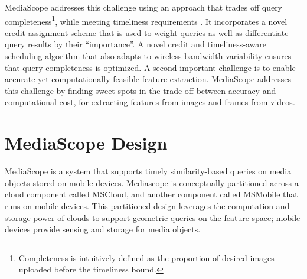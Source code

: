 \documentclass{sig-alt-release2}
\newcommand{\mscope}{MediaScope\xspace}
\begin{document}

\mscope addresses this challenge using an approach that trades off
query completeness\footnote{Completeness is intuitively defined as the proportion of desired images uploaded before the timeliness bound.}, while meeting
timeliness requirements
.
%
It incorporates a novel credit-assignment scheme that is used to
weight queries as well as differentiate query results
by their ``importance''.
%
A novel credit and timeliness-aware scheduling algorithm that also
adapts to wireless bandwidth variability ensures that query completeness
is optimized.
%
A second important challenge is to enable accurate yet
computationally-feasible feature extraction.
%
\mscope addresses this challenge by finding sweet spots in the
trade-off between accuracy and computational cost, for extracting
features from images and frames from videos.


%

\vspace{-0.3cm}
\section{MediaScope Design}
MediaScope is a system that supports timely similarity-based
queries on media objects stored on mobile devices.
%
Mediascope is conceptually partitioned across a cloud component
called MSCloud, and another component called MSMobile that runs
on mobile devices.
%
This partitioned design leverages the computation and storage
power of clouds to support geometric queries on the feature space;
mobile devices provide sensing and storage for media objects.
\end{document}
